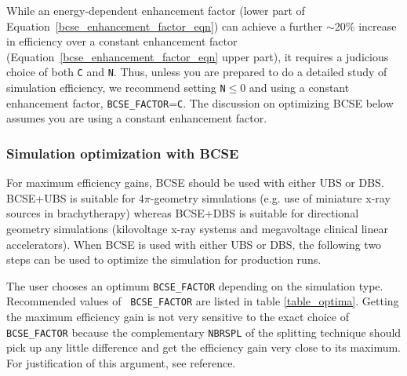 \documentclass[12pt,twoside]{article}
\begin{document}
While an energy-dependent enhancement factor
(lower part of Equation~\ref{bcse_enhancement_factor_eqn}) can achieve a further $\sim$20\%
increase in efficiency over a constant enhancement factor (Equation~\ref{bcse_enhancement_factor_eqn}
upper part), it requires a judicious choice of both {\tt C} and {\tt N}.  Thus, unless you are prepared to do a detailed
study of simulation efficiency, we recommend setting {\tt N}$\leq$0 and using a constant enhancement factor,
{\tt BCSE\_FACTOR}={\tt C}.
The
discussion on optimizing BCSE below assumes you are using a constant enhancement factor.

\subsubsection{Simulation optimization with BCSE}

For maximum efficiency gains, BCSE should be used with either UBS or
DBS. BCSE+UBS is suitable for 4$\pi$-geometry simulations (e.g. use of
miniature x-ray sources in brachytherapy) whereas BCSE+DBS is suitable
for directional geometry simulations (kilovoltage x-ray systems and
megavoltage clinical linear accelerators). When BCSE is used with
either UBS or DBS, the following two steps can be used to optimize the
simulation for production runs.

 The user chooses an optimum {\tt BCSE\_FACTOR}
depending on the simulation type. Recommended values of {\tt
BCSE\_FACTOR} are listed in table \ref{table_optima}. Getting the
maximum efficiency gain is not very sensitive to the exact choice of
{\tt BCSE\_FACTOR} because the complementary {\tt NBRSPL} of the
splitting technique should pick up any little difference and get the
efficiency gain very close to its maximum. For justification of this
argument, see reference\cite{AR07}.
\end{document}
